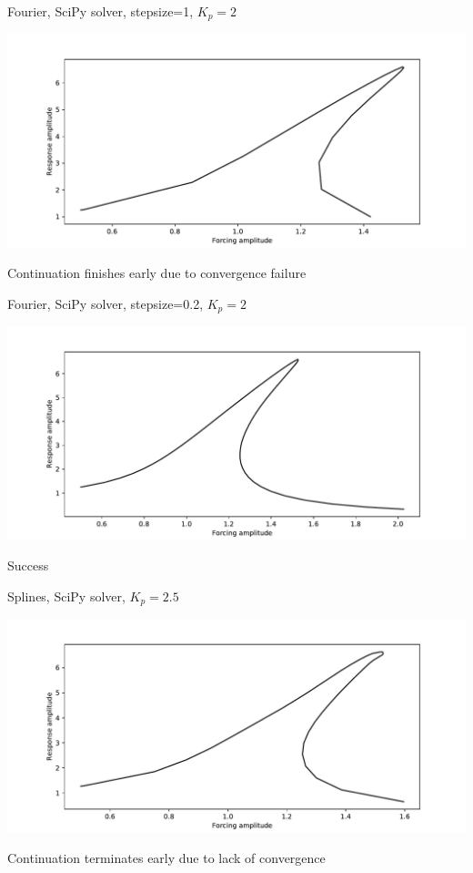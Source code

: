 \documentclass[presentation]{beamer}
\begin{document}
\begin{frame}[label={sec:orgc3d9c8b}]{Fourier, SciPy solver, stepsize=1, \(K_p=2\)}
\begin{center}
\includegraphics[width=.9\linewidth]{./kp2_transtime100_scipy_fourier.pdf}
\end{center}

Continuation finishes early due to convergence failure
\end{frame}

\begin{frame}[label={sec:org2925210}]{Fourier, SciPy solver, stepsize=0.2, \(K_p=2\)}
\begin{center}
\includegraphics[width=.9\linewidth]{./kp2_transtime100_scipy_fourier_ss0d2.pdf}
\end{center}

Success
\end{frame}

\begin{frame}[label={sec:org075ab64}]{Splines, SciPy solver, \(K_p=2.5\)}
\begin{center}
\includegraphics[width=.9\linewidth]{./kp2d5_transtime100_scipy.pdf}
\end{center}

Continuation terminates early due to lack of convergence
\end{frame}
\end{document}
